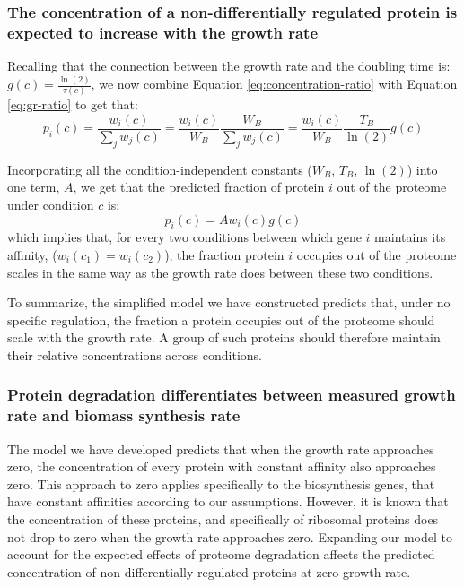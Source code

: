 \documentclass[a4paper]{article}
\begin{document}
\subsubsection{The concentration of a non-differentially regulated protein is expected to increase with the growth rate} 
Recalling that the connection between the growth rate and the doubling time is: $g(c)=\frac{\ln(2)}{\tau(c)}$, we now combine Equation \ref{eq:concentration-ratio} with Equation \ref{eq:gr-ratio} to get that:
\begin{equation}
  \label{eq:default-response}
  p_i(c)=\frac{w_i(c)}{\sum_jw_j(c)}=\frac{w_i(c)}{W_B}\frac{W_B}{\sum_jw_j(c)}=\frac{w_i(c)}{W_B}\frac{T_B}{\ln(2)}g(c)
\end{equation}

Incorporating all the condition-independent constants ($W_B$, $T_B$, $\ln(2)$) into one term, $A$, we get that the predicted fraction of protein $i$ out of the proteome under condition $c$ is:
\begin{equation}
  \label{eq:final-conc}
  p_i(c)=Aw_i(c)g(c)
\end{equation}
which implies that, for every two conditions between which gene $i$ maintains its affinity, ($w_i(c_1)=w_i(c_2)$), the fraction protein $i$ occupies out of the proteome scales in the same way as the growth rate does between these two conditions.

To summarize, the simplified model we have constructed predicts that, under no specific regulation, the fraction a protein occupies out of the proteome should scale with the growth rate.
A group of such proteins should therefore maintain their relative concentrations across conditions.

\subsubsection{Protein degradation differentiates between measured growth rate and biomass synthesis rate}
The model we have developed predicts that when the growth rate approaches zero, the concentration of every protein with constant affinity also approaches zero.
This approach to zero applies specifically to the biosynthesis genes, that have constant affinities according to our assumptions.
However, it is known that the concentration of these proteins, and specifically of ribosomal proteins does not drop to zero when the growth rate approaches zero.
Expanding our model to account for the expected effects of proteome degradation affects the predicted concentration of non-differentially regulated proteins at zero growth rate.
\end{document}
